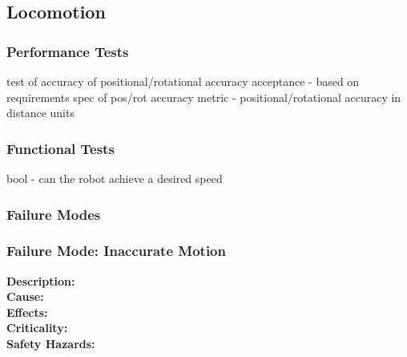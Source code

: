 
\subsection{Locomotion}
\label{sec:verification_locomotion}

\subsubsection{Performance Tests}
\label{sec:locomotion_pt}

test of accuracy of positional/rotational accuracy
acceptance - based on requirements spec of pos/rot accuracy
metric - positional/rotational accuracy in distance units

\subsubsection{Functional Tests}
\label{sec:locomotion_ft}

bool - can the robot achieve a desired speed


\subsubsection{Failure Modes}
\label{sec:locomotion_fm}

\subsubsection{Failure Mode: Inaccurate Motion}
\label{sec:locomotion_fm_motion}
\textbf{Description:} \\
\textbf{Cause:} \\
\textbf{Effects:} \\
\textbf{Criticality:}  \\
\textbf{Safety Hazards:} \\